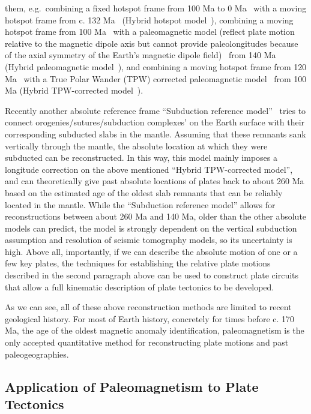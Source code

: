 them, e.g.\ combining a fixed hotspot frame from 100 Ma to 0 Ma~\cite{M93} with
a moving hotspot frame from c. 132 Ma~\cite{O05} (Hybrid hotspot
model~\cite{Sh12}), combining a moving hotspot frame from 100
Ma~\cite{O05} with a paleomagnetic model (reflect plate motion relative to the
magnetic dipole axis but cannot provide paleolongitudes because of the axial
symmetry of the Earth's magnetic dipole field)~\cite{T08} from 140
Ma (Hybrid paleomagnetic model~\cite{Sh12}), and combining a moving hotspot
frame from 120 Ma~\cite{O05} with a True Polar Wander (TPW)
corrected paleomagnetic model~\cite{S08} from 100 Ma (Hybrid
TPW-corrected model~\cite{Sh12}).

Recently another absolute reference frame ``Subduction reference
model''~\cite{v10} tries to connect orogenies/sutures/subduction complexes' on
the Earth surface with their corresponding subducted slabs in the mantle.
Assuming that these remnants sank vertically through the mantle, the absolute
location at which they were subducted can be reconstructed. In this way, this
model mainly imposes a longitude correction on the above mentioned ``Hybrid
TPW-corrected model'', and can theoretically give past absolute locations of
plates back to about 260 Ma based on the estimated age of the oldest slab
remnants that can be reliably located in the mantle. While the ``Subduction
reference model'' allows for reconstructions between about 260 Ma and 140 Ma,
older than the other absolute models can predict, the model is strongly
dependent on the vertical subduction assumption and resolution of seismic
tomography models, so its uncertainty is high. Above all, importantly, if we can
describe the absolute motion of one or a few key plates, the techniques for
establishing the relative plate motions described in the second paragraph above
can be used to construct plate circuits that allow a full kinematic description
of plate tectonics to be developed.

As we can see, all of these above reconstruction methods are limited to recent
geological history. For most of Earth history, concretely for times before c.
170 Ma, the age of the oldest magnetic anomaly identification, paleomagnetism
is the only accepted quantitative method for reconstructing plate motions and
past paleogeographies.

\subsection{Application of Paleomagnetism to Plate Tectonics}

